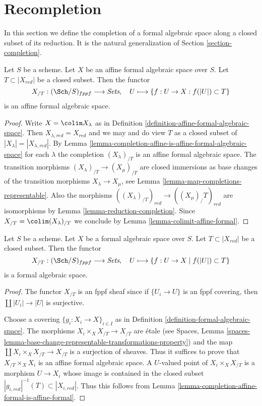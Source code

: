\section{Recompletion}
\label{section-recompletion}

\noindent
In this section we define the completion of a formal algebraic
space along a closed subset of its reduction. It is the natural
generalization of Section \ref{section-completion}.

\begin{lemma}
\label{lemma-completion-affine-formal-is-affine-formal}
Let $S$ be a scheme. Let $X$ be an affine formal algebraic space over $S$.
Let $T \subset |X_{red}|$ be a closed subset. Then the functor
$$
X_{/T} : (\Sch/S)_{fppf} \longrightarrow \textit{Sets},\quad
U \longmapsto \{f : U \to X : f(|U|) \subset T\}
$$
is an affine formal algebraic space.
\end{lemma}

\begin{proof}
Write $X = \colim X_\lambda$ as in
Definition \ref{definition-affine-formal-algebraic-space}.
Then $X_{\lambda, red} = X_{red}$ and we may and do view
$T$ as a closed subset of $|X_\lambda| = |X_{\lambda, red}|$.
By Lemma \ref{lemma-completion-affine-is-affine-formal-algebraic-space}
for each $\lambda$ the completion
$(X_\lambda)_{/T}$ is an affine formal algebraic space.
The transition morphisms $(X_\lambda)_{/T} \to (X_\mu)_{/T}$ are
closed immersions as base changes of the transition morphisms
$X_\lambda \to X_\mu$, see Lemma \ref{lemma-map-completions-representable}.
Also the morphisms $((X_\lambda)_{/T})_{red} \to ((X_\mu)_/T)_{red}$
are isomorphisms by Lemma \ref{lemma-reduction-completion}.
Since $X_{/T} = \colim (X_\lambda)_{/T}$ we conclude
by Lemma \ref{lemma-colimit-affine-formal}.
\end{proof}

\begin{lemma}
\label{lemma-completion-fas-is-fas}
Let $S$ be a scheme. Let $X$ be a formal algebraic space over $S$.
Let $T \subset |X_{red}|$ be a closed subset. Then the functor
$$
X_{/T} : (\Sch/S)_{fppf} \longrightarrow \textit{Sets},\quad
U \longmapsto \{f : U \to X \mid f(|U|) \subset T\}
$$
is a formal algebraic space.
\end{lemma}

\begin{proof}
The functor $X_{/T}$ is an fppf sheaf since if
$\{U_i \to U\}$ is an fppf covering, then
$\coprod |U_i| \to |U|$ is surjective.

\medskip\noindent
Choose a covering $\{g_i : X_i \to X\}_{i \in I}$ as in Definition
\ref{definition-formal-algebraic-space}.
The morphisms $X_i \times_X X_{/T} \to X_{/T}$ are \'etale
(see Spaces, Lemma
\ref{spaces-lemma-base-change-representable-transformations-property})
and the map $\coprod X_i \times_X X_{/T} \to X_{/T}$ is a surjection of
sheaves. Thus it suffices to prove that $X_{/T} \times_X X_i$
is an affine formal algebraic space. A $U$-valued point of
$X_i \times_X X_{/T}$ is a morphism $U \to X_i$ whose image is
contained in the closed subset
$|g_{i, red}|^{-1}(T) \subset |X_{i, red}|$. Thus this follows from
Lemma \ref{lemma-completion-affine-formal-is-affine-formal}.
\end{proof}


